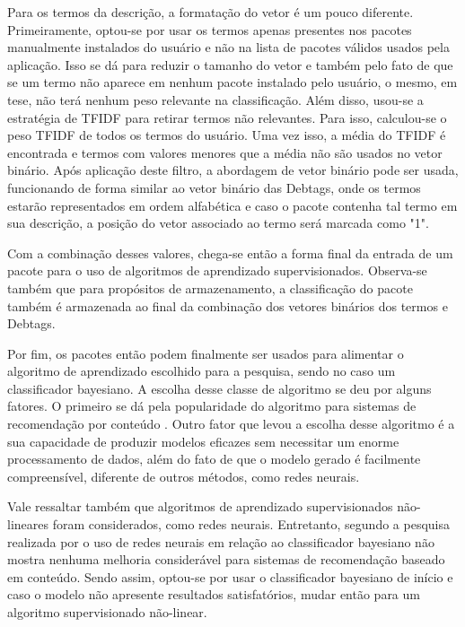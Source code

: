 Para os termos da descrição, a formatação do vetor é um pouco diferente. Primeiramente, optou-se por usar os termos apenas presentes
nos pacotes manualmente instalados do usuário e não na lista de pacotes válidos
usados pela aplicação. Isso se dá para reduzir o tamanho do vetor e também
pelo fato de que se um termo não aparece em nenhum pacote instalado pelo
usuário, o mesmo, em tese, não terá nenhum peso relevante na
classificação. Além disso, usou-se a estratégia de TFIDF para retirar termos não
relevantes. Para isso, calculou-se o peso TFIDF de todos os termos do usuário.
Uma vez isso, a média do TFIDF é encontrada e termos com valores menores que a
média não são usados no vetor binário. Após aplicação deste filtro, a abordagem de vetor binário pode ser usada, funcionando de forma
similar ao vetor binário das Debtags, onde os termos estarão representados em ordem alfabética e caso o pacote contenha tal termo em sua
descrição, a posição do vetor associado ao termo será marcada como "1".

Com a combinação desses valores, chega-se então a forma final da entrada de um pacote para o uso de algoritmos de aprendizado
supervisionados. Observa-se também que para propósitos de armazenamento, a classificação do pacote também é armazenada ao final da combinação
dos vetores binários dos termos e Debtags.

Por fim, os pacotes então podem finalmente ser usados para alimentar o algoritmo de aprendizado escolhido para a pesquisa, sendo no caso um
classificador bayesiano. A escolha desse classe de algoritmo se deu por alguns fatores. O primeiro se dá pela popularidade do algoritmo para
sistemas de recomendação por conteúdo \cite{amatriain2011data}. Outro fator que levou a escolha desse algoritmo é a sua capacidade de produzir
modelos eficazes sem necessitar um enorme processamento de dados, além do fato
de que o modelo gerado é facilmente compreensível, diferente de outros métodos,
como redes neurais\cite{segaran2007programming}.

Vale ressaltar também que algoritmos de aprendizado supervisionados não-lineares foram considerados, como redes neurais. Entretanto, segundo
a pesquisa realizada por \cite{pazzani1997learning} o uso de redes neurais em relação ao classificador bayesiano não mostra nenhuma melhoria
considerável para sistemas de recomendação baseado em conteúdo. Sendo assim, optou-se por usar o classificador bayesiano de início e caso o modelo não apresente
resultados satisfatórios, mudar então para um algoritmo supervisionado não-linear.

